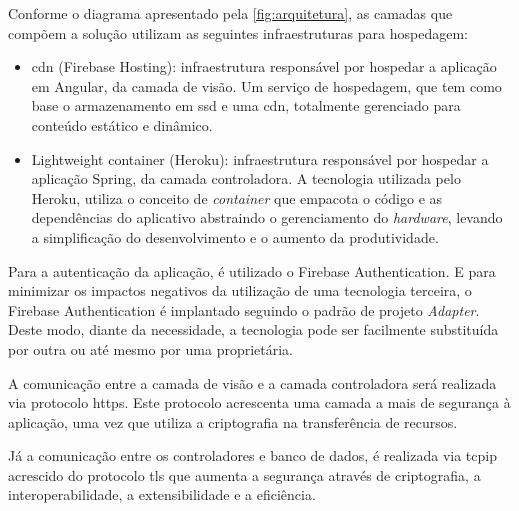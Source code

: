 Conforme o diagrama apresentado pela \autoref{fig:arquitetura}, as camadas que compõem a solução utilizam as seguintes infraestruturas para hospedagem:
\begin{itemize}
\item \ac{cdn} (Firebase Hosting): infraestrutura responsável por hospedar a aplicação em Angular, da camada de visão. Um serviço de hospedagem, que tem como base o armazenamento em \ac{ssd} e uma \ac{cdn}, totalmente gerenciado para conteúdo estático e dinâmico.
\item  Lightweight container (Heroku): infraestrutura responsável por hospedar a aplicação Spring, da camada controladora. A tecnologia utilizada pelo Heroku, utiliza o conceito de \textit{\gls{container}} que empacota o código e as dependências do aplicativo abstraindo o gerenciamento do \textit{\gls{hardware}}, levando a simplificação do desenvolvimento e o aumento da produtividade.
\end{itemize}

Para a autenticação da aplicação, é utilizado o Firebase Authentication. E para minimizar os impactos negativos da utilização de uma tecnologia terceira, o Firebase Authentication é implantado seguindo o padrão de projeto \textit{Adapter}. Deste modo, diante da necessidade, a tecnologia pode ser facilmente substituída por outra ou até mesmo por uma proprietária.


A comunicação entre a camada de visão e a camada controladora será realizada via protocolo \ac{https}. Este protocolo acrescenta uma camada a mais de segurança à aplicação, uma vez que utiliza a criptografia na transferência de recursos.


Já a comunicação entre os controladores e banco de dados, é realizada via \ac{tcpip} acrescido do protocolo \ac{tls} que aumenta a segurança através de criptografia, a interoperabilidade, a extensibilidade e a eficiência.


